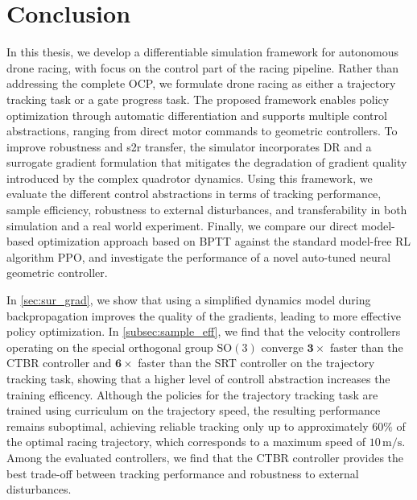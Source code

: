 
\chapter{Conclusion}\label{chap:conclusion}


In this thesis, we develop a differentiable simulation framework for autonomous drone racing, with focus on the control part of the racing pipeline.
Rather than addressing the complete \ac{OCP}, we formulate drone racing as either a trajectory tracking task or a gate progress task.
The proposed framework enables policy optimization through automatic differentiation and supports multiple control abstractions, ranging from direct motor commands to geometric controllers.
To improve robustness and \ac{s2r} transfer, the simulator incorporates \ac{DR} and a surrogate gradient formulation that mitigates the degradation of gradient quality introduced by the complex quadrotor dynamics.
Using this framework, we evaluate the different control abstractions in terms of tracking performance, sample efficiency, robustness to external disturbances, and transferability in both simulation and a real world experiment.
Finally, we compare our direct model-based optimization approach based on \ac{BPTT} against the standard model-free \ac{RL} algorithm \ac{PPO}, and investigate the performance of a novel auto-tuned neural geometric controller.

In \autoref{sec:sur_grad}, we show that using a simplified dynamics model during backpropagation improves the quality of the gradients, leading to more effective policy optimization.
In \autoref{subsec:sample_eff}, we find that the velocity controllers operating on the special orthogonal group $\mathrm{SO}(3)$ converge $\mathbf{3\times}$ faster than the \ac{CTBR} controller and $\mathbf{6\times}$ faster than the \ac{SRT} controller on the trajectory tracking task, showing that a higher level of controll abstraction increases the training efficency.
Although the policies for the trajectory tracking task are trained using curriculum on the trajectory speed, the resulting performance remains suboptimal, achieving reliable tracking only up to approximately $60\%$ of the optimal racing trajectory, which corresponds to a maximum speed of $10\, \mathrm{m/s}$.
Among the evaluated controllers, we find that the \ac{CTBR} controller provides the best trade-off between tracking performance and robustness to external disturbances.


